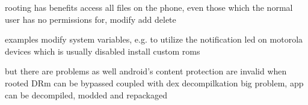 rooting has benefits
access all files on the phone, even those which the normal user has no permissions for, modify add delete

examples
modify system variables, e.g. to utilize the notification led on motorola devices which is usually disabled
install custom roms

but there are problems as well
android's content protection are invalid when rooted
DRm can be bypassed
coupled with dex decompilkation big problem, app can be decompiled, modded and repackaged\cite{levinAndevcon}

%

%
%


%

